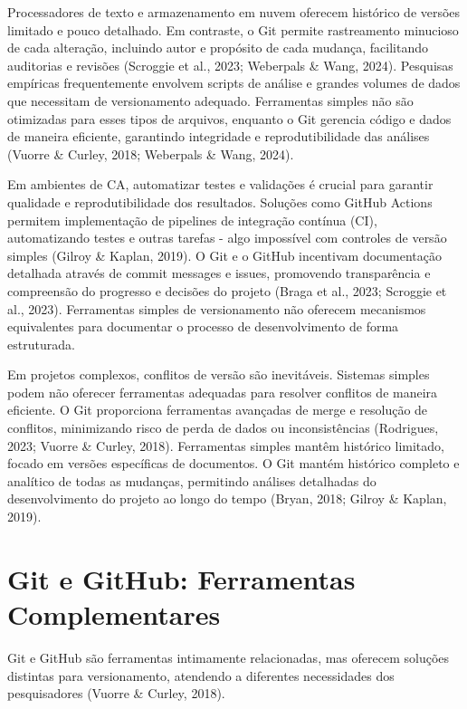 \documentclass[
  a4paper,
]{book}
\begin{document}
Processadores de texto e armazenamento em nuvem oferecem histórico de
versões limitado e pouco detalhado. Em contraste, o Git permite
rastreamento minucioso de cada alteração, incluindo autor e propósito de
cada mudança, facilitando auditorias e revisões (Scroggie et al., 2023;
Weberpals \& Wang, 2024). Pesquisas empíricas frequentemente envolvem
scripts de análise e grandes volumes de dados que necessitam de
versionamento adequado. Ferramentas simples não são otimizadas para
esses tipos de arquivos, enquanto o Git gerencia código e dados de
maneira eficiente, garantindo integridade e reprodutibilidade das
análises (Vuorre \& Curley, 2018; Weberpals \& Wang, 2024).

Em ambientes de CA, automatizar testes e validações é crucial para
garantir qualidade e reprodutibilidade dos resultados. Soluções como
GitHub Actions permitem implementação de pipelines de integração
contínua (CI), automatizando testes e outras tarefas - algo impossível
com controles de versão simples (Gilroy \& Kaplan, 2019). O Git e o
GitHub incentivam documentação detalhada através de commit messages e
issues, promovendo transparência e compreensão do progresso e decisões
do projeto (Braga et al., 2023; Scroggie et al., 2023). Ferramentas
simples de versionamento não oferecem mecanismos equivalentes para
documentar o processo de desenvolvimento de forma estruturada.

Em projetos complexos, conflitos de versão são inevitáveis. Sistemas
simples podem não oferecer ferramentas adequadas para resolver conflitos
de maneira eficiente. O Git proporciona ferramentas avançadas de merge e
resolução de conflitos, minimizando risco de perda de dados ou
inconsistências (Rodrigues, 2023; Vuorre \& Curley, 2018). Ferramentas
simples mantêm histórico limitado, focado em versões específicas de
documentos. O Git mantém histórico completo e analítico de todas as
mudanças, permitindo análises detalhadas do desenvolvimento do projeto
ao longo do tempo (Bryan, 2018; Gilroy \& Kaplan, 2019).

\section{Git e GitHub: Ferramentas
Complementares}\label{git-e-github-ferramentas-complementares}

Git e GitHub são ferramentas intimamente relacionadas, mas oferecem
soluções distintas para versionamento, atendendo a diferentes
necessidades dos pesquisadores (Vuorre \& Curley, 2018).
\end{document}
